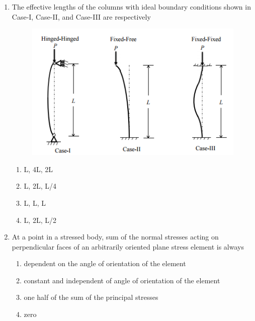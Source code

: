 \documentclass[a4paper,10pt]{article}
\begin{document}
\begin{enumerate}
    \item The effective lengths of the columns with ideal boundary conditions shown in Case-I, Case-II, and Case-III are respectively
    \begin{figure}[H] \centering \includegraphics[width=\columnwidth]{q3_solid.png} \caption*{} \label{fig:q3_solid} \end{figure}
    \hfill{}
    \begin{enumerate}[label=\Alph*)]
        \item L, 4L, 2L
        \item L, 2L, L/4
        \item L, L, L
        \item L, 2L, L/2
    \end{enumerate}

    \item At a point in a stressed body, sum of the normal stresses acting on perpendicular faces of an arbitrarily oriented plane stress element is always
    \hfill{}
    \begin{enumerate}[label=\Alph*)]
        \item dependent on the angle of orientation of the element
        \item constant and independent of angle of orientation of the element
        \item one half of the sum of the principal stresses
        \item zero
    \end{enumerate}


\end{enumerate}
\end{document}
